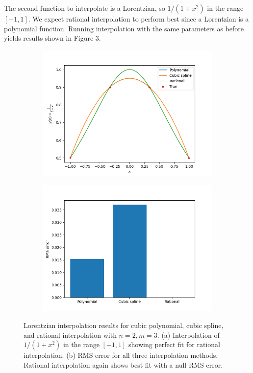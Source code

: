 \documentclass{article}
\begin{document}
The second function to interpolate is a Lorentzian, so $1/(1+x^2)$ in the range $[-1, 1]$. We expect rational interpolation to perform best since a Lorentzian is a polynomial function. Running interpolation with the same parameters as before yields results shown in Figure 3.
\begin{figure}[h!]
\centering
\begin{subfigure}{.5\textwidth}
  \centering
  \includegraphics[width=\linewidth]{images/prob3_lorentzian_func_4points.png}
  \caption{}
\end{subfigure}%
\begin{subfigure}{.5\textwidth}
  \centering
  \includegraphics[width=\linewidth]{images/prob3_lorentzian_errs_4points.png}
  \caption{}
\end{subfigure}
\caption{Lorentzian interpolation results for cubic polynomial, cubic spline, and rational interpolation with $n=2, m=3$. (a) Interpolation of $1/(1+x^2)$ in the range $[-1, 1]$ showing perfect fit for rational interpolation. (b) RMS error for all three interpolation methods. Rational interpolation again shows best fit with a null RMS error.}
\label{fig:lorentzian_4points_results}
\end{figure}
\end{document}
